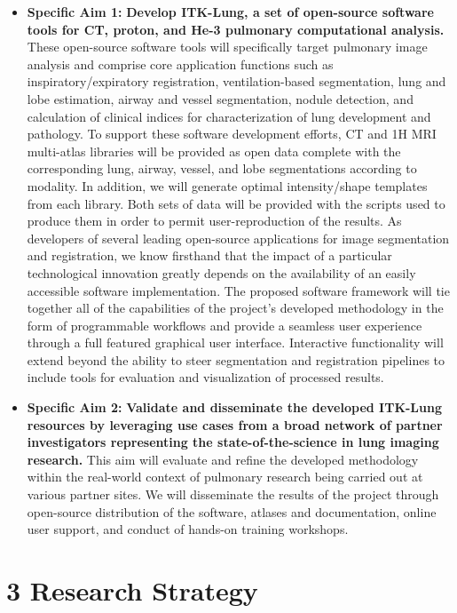 \documentclass[11pt,]{article}
\begin{document}
\begin{itemize}
\itemsep1pt\parskip0pt
\item
  \textbf{Specific Aim 1:} \textbf{Develop ITK-Lung, a set of
  open-source software tools for CT, proton, and He-3 pulmonary
  computational analysis.} These open-source software tools will
  specifically target pulmonary image analysis and comprise core
  application functions such as inspiratory/expiratory registration,
  ventilation-based segmentation, lung and lobe estimation, airway and
  vessel segmentation, nodule detection, and calculation of clinical
  indices for characterization of lung development and pathology. To
  support these software development efforts, CT and 1H MRI multi-atlas
  libraries will be provided as open data complete with the
  corresponding lung, airway, vessel, and lobe segmentations according
  to modality. In addition, we will generate optimal intensity/shape
  templates from each library. Both sets of data will be provided with
  the scripts used to produce them in order to permit user-reproduction
  of the results. As developers of several leading open-source
  applications for image segmentation and registration, we know
  firsthand that the impact of a particular technological innovation
  greatly depends on the availability of an easily accessible software
  implementation. The proposed software framework will tie together all
  of the capabilities of the project's developed methodology in the form
  of programmable workflows and provide a seamless user experience
  through a full featured graphical user interface. Interactive
  functionality will extend beyond the ability to steer segmentation and
  registration pipelines to include tools for evaluation and
  visualization of processed results.
\item
  \textbf{Specific Aim 2:} \textbf{Validate and disseminate the
  developed ITK-Lung resources by leveraging use cases from a broad
  network of partner investigators representing the state-of-the-science
  in lung imaging research.} This aim will evaluate and refine the
  developed methodology within the real-world context of pulmonary
  research being carried out at various partner sites. We will
  disseminate the results of the project through open-source
  distribution of the software, atlases and documentation, online user
  support, and conduct of hands-on training workshops.
\end{itemize}

\newpage

\section{3 Research Strategy}\label{research-strategy}
\end{document}
